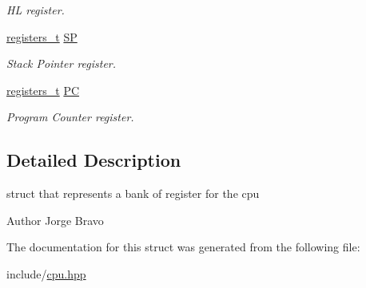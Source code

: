 \begin{DoxyCompactItemize}
\begin{DoxyCompactList}\small\item\em HL register. \end{DoxyCompactList}\item 
\hyperlink{unionregisters__t}{registers\+\_\+t} \hyperlink{structbank__t_a1c187d46604c4ab5c8a8948da9d41ed5}{SP}\hypertarget{structbank__t_a1c187d46604c4ab5c8a8948da9d41ed5}{}\label{structbank__t_a1c187d46604c4ab5c8a8948da9d41ed5}

\begin{DoxyCompactList}\small\item\em Stack Pointer register. \end{DoxyCompactList}\item 
\hyperlink{unionregisters__t}{registers\+\_\+t} \hyperlink{structbank__t_add19fafaaff3a9c1e77fbd6a5036e22b}{PC}\hypertarget{structbank__t_add19fafaaff3a9c1e77fbd6a5036e22b}{}\label{structbank__t_add19fafaaff3a9c1e77fbd6a5036e22b}

\begin{DoxyCompactList}\small\item\em Program Counter register. \end{DoxyCompactList}\end{DoxyCompactItemize}


\subsection{Detailed Description}
struct that represents a bank of register for the cpu 

\begin{DoxyAuthor}{Author}
Jorge Bravo 
\end{DoxyAuthor}


The documentation for this struct was generated from the following file\+:\begin{DoxyCompactItemize}
\item 
include/\hyperlink{cpu_8hpp}{cpu.\+hpp}\end{DoxyCompactItemize}
